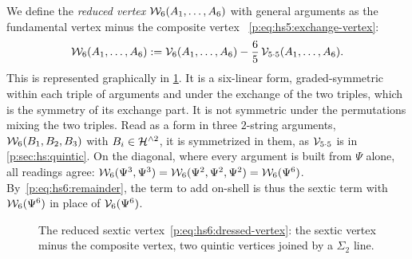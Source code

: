 We define the \emph{reduced vertex} $\mathcal{W}_{6}(A_1, \ldots, A_6)$ with general arguments as the fundamental vertex minus the composite vertex ~\eqref{p:eq:hs5:exchange-vertex}:
\begin{equation}
  \label{p:eq:hs6:dressed-vertex}
  \mathcal{W}_{6}(A_1, \ldots, A_6)
    := \mathcal{V}_{6}(A_1, \ldots, A_6) - \frac{6}{5} \, \mathcal{V}_{5 \cdot 5}(A_1, \ldots, A_6).
\end{equation}
This is represented graphically in \cref{p:fig:hs6:dressed-vertex}.
It is a six-linear form, graded-symmetric within each triple of arguments and under the exchange of the two triples, which is the symmetry of its exchange part.
It is not symmetric under the permutations mixing the two triples.
Read as a form in three $2$-string arguments, $\mathcal{W}_{6}(B_1, B_2, B_3)$ with $B_i \in \mathcal{H}^{\wedge 2}$, it is symmetrized in them, as $\mathcal{V}_{5 \cdot 5}$ is in \cref{p:sec:hs:quintic}.
On the diagonal, where every argument is built from $\Psi$ alone, all readings agree: $\mathcal{W}_{6}(\Psi^3, \Psi^3) = \mathcal{W}_{6}(\Psi^2, \Psi^2, \Psi^2) = \mathcal{W}_{6}(\Psi^6)$.
By~\eqref{p:eq:hs6:remainder}, the term to add on-shell is thus the sextic term with $\mathcal{W}_{6}(\Psi^6)$ in place of $\mathcal{V}_{6}(\Psi^6)$.
\begin{figure}[htp]
  \centering
  \caption{The reduced sextic vertex~\eqref{p:eq:hs6:dressed-vertex}: the sextic vertex minus the composite vertex, two quintic vertices joined by a $\Sigma_2$ line.}
  \label{p:fig:hs6:dressed-vertex}
\end{figure}



